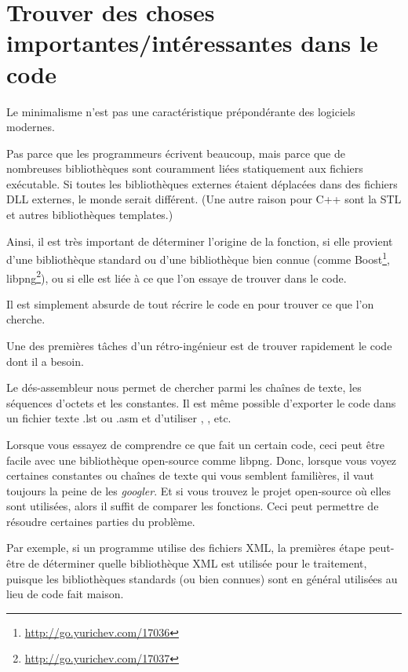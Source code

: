 \chapter{Trouver des choses importantes/intéressantes dans le code}

Le minimalisme n'est pas une caractéristique prépondérante des logiciels modernes.


Pas parce que les programmeurs écrivent beaucoup, mais parce que de nombreuses bibliothèques
sont couramment liées statiquement aux fichiers exécutable.
Si toutes les bibliothèques externes étaient déplacées dans des fichiers DLL externes,
le monde serait différent. (Une autre raison pour C++ sont la \ac{STL} et autres
bibliothèques templates.)

\newcommand{\FOOTNOTEBOOST}{\footnote{\url{http://go.yurichev.com/17036}}}
\newcommand{\FOOTNOTELIBPNG}{\footnote{\url{http://go.yurichev.com/17037}}}

Ainsi, il est très important de déterminer l'origine de la fonction, si elle provient
d'une bibliothèque standard ou d'une bibliothèque bien connue (comme Boost\FOOTNOTEBOOST,
libpng\FOOTNOTELIBPNG), ou si elle est liée à ce que l'on essaye de trouver dans
le code.

Il est simplement absurde de tout récrire le code en \CCpp pour trouver ce que l'on
cherche.

Une des premières tâches d'un rétro-ingénieur est de trouver rapidement le code dont
il a besoin.

\myindex{\GrepUsage}

Le dés-assembleur \IDA nous permet de chercher parmi les chaînes de texte, les séquences
d'octets et les constantes.
Il est même possible d'exporter le code dans un fichier texte .lst ou .asm et d'utiliser
, , etc.

Lorsque vous essayez de comprendre ce que fait un certain code, ceci peut être facile
avec une bibliothèque open-source comme libpng.
Donc, lorsque vous voyez certaines constantes ou chaînes de texte qui vous semblent
familières, il vaut toujours la peine de les \emph{googler}.
Et si vous trouvez le projet open-source où elles sont utilisées, alors il suffit
de comparer les fonctions.
Ceci peut permettre de résoudre certaines parties du problème.

Par exemple, si un programme utilise des fichiers XML, la premières étape peut-être
de déterminer quelle bibliothèque XML est utilisée pour le traitement, puisque les
bibliothèques standards (ou bien connues) sont en général utilisées au lieu de code
fait maison.


